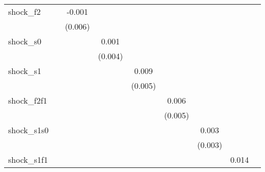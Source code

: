{\begin{tabular}{l*{8}{c}}
\addlinespace
shock\_f2    &                     &      -0.001         &                     &                     &                     &                     &                     &                     \\
            &                     &     (0.006)         &                     &                     &                     &                     &                     &                     \\
\addlinespace
shock\_s0    &                     &                     &       0.001         &                     &                     &                     &                     &                     \\
            &                     &                     &     (0.004)         &                     &                     &                     &                     &                     \\
\addlinespace
shock\_s1    &                     &                     &                     &       0.009\sym{*}  &                     &                     &                     &                     \\
            &                     &                     &                     &     (0.005)         &                     &                     &                     &                     \\
\addlinespace
shock\_f2f1  &                     &                     &                     &                     &       0.006         &                     &                     &                     \\
            &                     &                     &                     &                     &     (0.005)         &                     &                     &                     \\
\addlinespace
shock\_s1s0  &                     &                     &                     &                     &                     &       0.003         &                     &                     \\
            &                     &                     &                     &                     &                     &     (0.003)         &                     &                     \\
\addlinespace
shock\_s1f1  &                     &                     &                     &                     &                     &                     &       0.014\sym{*}  &                     \\

\end{tabular}}

